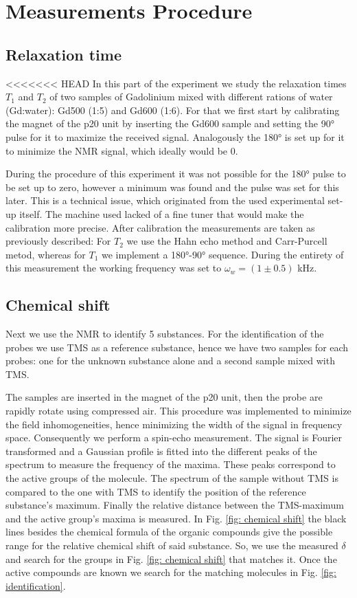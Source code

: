 \section{Measurements Procedure}
\subsection{Relaxation time}
<<<<<<< HEAD
In this part of the experiment we study the relaxation times $T_1$ and $T_2$ of two samples of Gadolinium mixed with different rations of water (Gd:water): Gd500 (1:5) and Gd600 (1:6). For that we first start by calibrating the magnet of the p20 unit by inserting the Gd600 sample and setting the 90° pulse for it to maximize the received signal. Analogously the 180° is set up for it to minimize the NMR signal, which ideally would be 0. 

During the procedure of this experiment it was not possible for the 180° pulse to be set up to zero, however a minimum was found and the pulse was set for this later. This is a technical issue, which originated from the used experimental set-up itself. The machine used lacked of a fine tuner that would make the calibration more precise. 
After calibration the measurements are taken as previously described: For $T_2$ we use the Hahn echo method and Carr-Purcell metod, whereas for $T_1$ we implement a 180°-90° sequence. 
During the entirety of this measurement the working frequency was set to $\omega_w = (1 \pm 0.5)$ kHz.
\subsection{Chemical shift}
\label{sec: chemical shift}

Next we use the NMR to identify 5 substances. For the identification of the probes we use TMS as a reference substance, hence we have two samples for each probes: one for the unknown substance alone and a second sample mixed with TMS.

The samples are inserted in the magnet of the p20 unit, then the probe are rapidly rotate using compressed air. This procedure was implemented to minimize the field inhomogeneities, hence minimizing the width of the signal in frequency space. Consequently we perform a spin-echo measurement. The signal is Fourier transformed and a Gaussian profile is fitted into the different peaks of the spectrum to measure the frequency of the maxima. These peaks correspond to the active groups of the molecule.
The spectrum of the sample without TMS is compared to the one with TMS to identify the position of the reference substance's maximum. Finally the relative distance between the TMS-maximum and the active group's maxima is measured. In Fig. \ref{fig: chemical shift} the black lines besides the chemical formula of the organic compounds give the possible range for the relative chemical shift of said substance. So, we use the measured $\delta$  and search for the groups in Fig. \ref{fig: chemical shift} that matches it. Once the active compounds are known we search for the matching molecules in Fig. \ref{fig: identification}.

